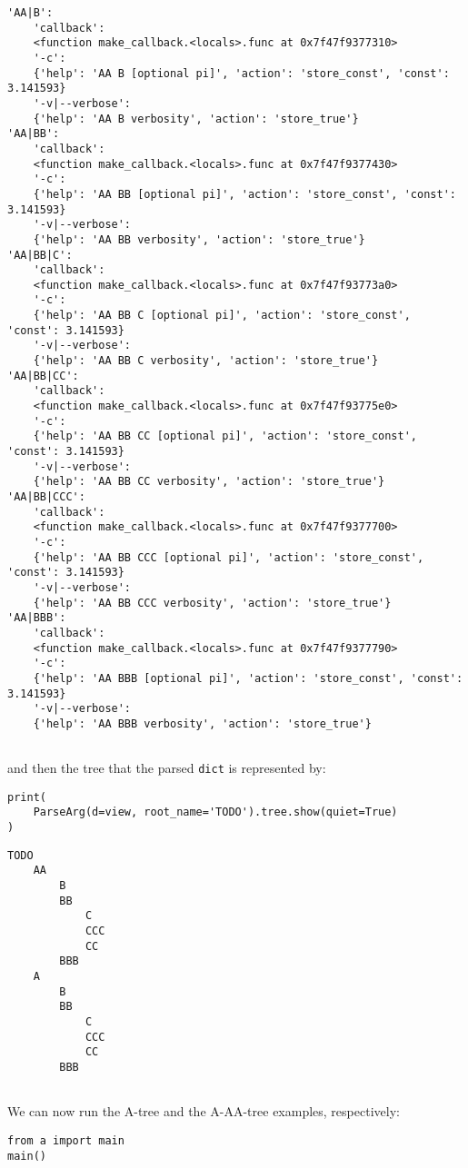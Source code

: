 \documentclass[10pt]{amsart}
\numberwithin{equation}{section}
\begin{document}
\begin{verbatim}
'AA|B':
    'callback':
    <function make_callback.<locals>.func at 0x7f47f9377310>
    '-c':
    {'help': 'AA B [optional pi]', 'action': 'store_const', 'const': 3.141593}
    '-v|--verbose':
    {'help': 'AA B verbosity', 'action': 'store_true'}
'AA|BB':
    'callback':
    <function make_callback.<locals>.func at 0x7f47f9377430>
    '-c':
    {'help': 'AA BB [optional pi]', 'action': 'store_const', 'const': 3.141593}
    '-v|--verbose':
    {'help': 'AA BB verbosity', 'action': 'store_true'}
'AA|BB|C':
    'callback':
    <function make_callback.<locals>.func at 0x7f47f93773a0>
    '-c':
    {'help': 'AA BB C [optional pi]', 'action': 'store_const', 'const': 3.141593}
    '-v|--verbose':
    {'help': 'AA BB C verbosity', 'action': 'store_true'}
'AA|BB|CC':
    'callback':
    <function make_callback.<locals>.func at 0x7f47f93775e0>
    '-c':
    {'help': 'AA BB CC [optional pi]', 'action': 'store_const', 'const': 3.141593}
    '-v|--verbose':
    {'help': 'AA BB CC verbosity', 'action': 'store_true'}
'AA|BB|CCC':
    'callback':
    <function make_callback.<locals>.func at 0x7f47f9377700>
    '-c':
    {'help': 'AA BB CCC [optional pi]', 'action': 'store_const', 'const': 3.141593}
    '-v|--verbose':
    {'help': 'AA BB CCC verbosity', 'action': 'store_true'}
'AA|BBB':
    'callback':
    <function make_callback.<locals>.func at 0x7f47f9377790>
    '-c':
    {'help': 'AA BBB [optional pi]', 'action': 'store_const', 'const': 3.141593}
    '-v|--verbose':
    {'help': 'AA BBB verbosity', 'action': 'store_true'}


\end{verbatim}
and then the tree that the parsed \texttt{dict} is represented by:
\begin{verbatim}
print(
    ParseArg(d=view, root_name='TODO').tree.show(quiet=True)
)
\end{verbatim}

\begin{verbatim}
TODO
    AA
        B
        BB
            C
            CCC
            CC
        BBB
    A
        B
        BB
            C
            CCC
            CC
        BBB


\end{verbatim}


We can now run the A-tree and the A-AA-tree examples, respectively:
\begin{verbatim}
from a import main
main()
\end{verbatim}
\end{document}
